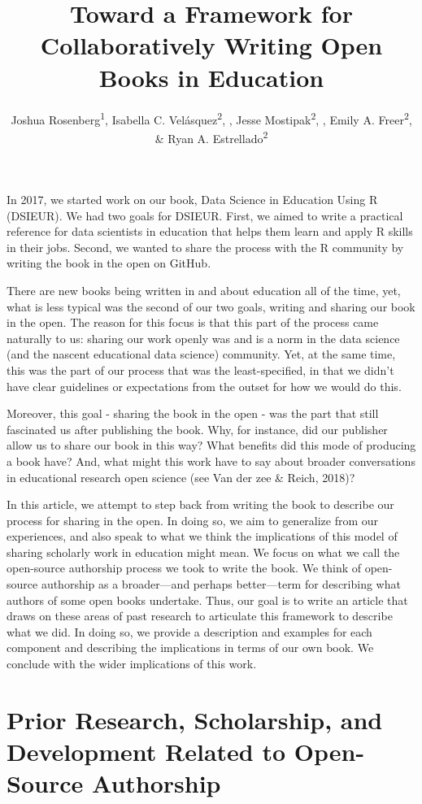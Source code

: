\documentclass[
  english,
  man]{apa6}
\title{Toward a Framework for Collaboratively Writing Open Books in Education}
\author{Joshua Rosenberg\textsuperscript{1}, Isabella C. Velásquez\textsuperscript{2}, , Jesse Mostipak\textsuperscript{2}, , Emily A. Freer\textsuperscript{2}, \& Ryan A. Estrellado\textsuperscript{2}}
\date{}
\affiliation{\vspace{0.5cm}\textsuperscript{1} University of Tennessee, Knoxville\\\textsuperscript{2} }
\begin{document}
\maketitle

In 2017, we started work on our book, Data Science in Education Using R (DSIEUR). We had two goals for DSIEUR. First, we aimed to write a practical reference for data scientists in education that helps them learn and apply R skills in their jobs. Second, we wanted to share the process with the R community by writing the book in the open on GitHub.

There are new books being written in and about education all of the time, yet, what is less typical was the second of our two goals, writing and sharing our book in the open. The reason for this focus is that this part of the process came naturally to us: sharing our work openly was and is a norm in the data science (and the nascent educational data science) community. Yet, at the same time, this was the part of our process that was the least-specified, in that we didn't have clear guidelines or expectations from the outset for how we would do this.

Moreover, this goal - sharing the book in the open - was the part that still fascinated us after publishing the book. Why, for instance, did our publisher allow us to share our book in this way? What benefits did this mode of producing a book have? And, what might this work have to say about broader conversations in educational research open science (see Van der zee \& Reich, 2018)?

In this article, we attempt to step back from writing the book to describe our process for sharing in the open. In doing so, we aim to generalize from our experiences, and also speak to what we think the implications of this model of sharing scholarly work in education might mean. We focus on what we call the open-source authorship process we took to write the book. We think of open-source authorship as a broader---and perhaps better---term for describing what authors of some open books undertake. Thus, our goal is to write an article that draws on these areas of past research to articulate this framework to describe what we did. In doing so, we provide a description and examples for each component and describing the implications in terms of our own book. We conclude with the wider implications of this work.

\hypertarget{prior-research-scholarship-and-development-related-to-open-source-authorship}{%
\section{Prior Research, Scholarship, and Development Related to Open-Source Authorship}\label{prior-research-scholarship-and-development-related-to-open-source-authorship}}
\end{document}
